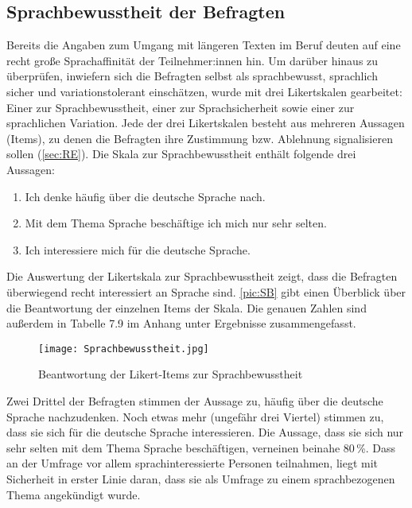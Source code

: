 \subsection{Sprachbewusstheit der Befragten}
\label{sec:Sprachbewusstheit}
Bereits die Angaben zum Umgang mit längeren Texten im Beruf deuten auf eine recht große Sprachaffinität der Teilnehmer:innen hin. 
Um darüber hinaus zu überprüfen, inwiefern sich die Befragten selbst als sprachbewusst, sprachlich sicher und variationstolerant einschätzen, wurde mit drei Likertskalen gearbeitet:
Einer zur Sprachbewusstheit, einer zur Sprachsicherheit sowie einer zur sprachlichen Variation. 
Jede der drei Likertskalen besteht aus mehreren Aussagen (Items), zu denen die Befragten ihre Zustimmung bzw. Ablehnung signalisieren sollen (\autoref{sec:RE}). 
Die Skala zur Sprachbewusstheit enthält folgende drei Aussagen: 
\begin{enumerate}
\item Ich denke häufig über die deutsche Sprache nach.
\item Mit dem Thema Sprache beschäftige ich mich nur sehr selten.
\item Ich interessiere mich für die deutsche Sprache. 
\end{enumerate}

\noindent Die Auswertung der Likertskala zur Sprachbewusstheit zeigt, dass die Befragten überwiegend recht interessiert an Sprache sind. 
\autoref{pic:SB} gibt einen Überblick über die Beantwortung der einzelnen Items der Skala. 
Die genauen Zahlen sind außerdem in Tabelle 7.9 im Anhang unter Ergebnisse zusammengefasst. 
\begin{figure}
\centering
\texttt{[image: Sprachbewusstheit.jpg]}
\caption{Beantwortung der Likert-Items zur Sprachbewusstheit}
\label{pic:SB}
\end{figure}
 
Zwei Drittel der Befragten stimmen der Aussage zu, häufig über die deutsche Sprache nachzudenken. 
Noch etwas mehr (ungefähr drei Viertel) stimmen zu, dass sie sich für die deutsche Sprache interessieren. 
Die Aussage, dass sie sich nur sehr selten mit dem Thema Sprache beschäftigen, verneinen beinahe 80\,\%. 
Dass an der Umfrage vor allem sprachinteressierte Personen teilnahmen, liegt mit Sicherheit in erster Linie daran, dass sie als Umfrage zu einem sprachbezogenen Thema angekündigt wurde. 
